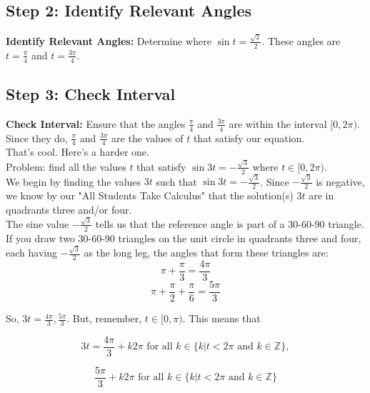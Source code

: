 \documentclass[12pt]{article}
\begin{document}
\subsection*{Step 2: Identify Relevant Angles}
\textbf{Identify Relevant Angles:} Determine where \( \sin t = \frac{\sqrt{2}}{2} \). These angles are \( t = \frac{\pi}{4} \) and \( t = \frac{3\pi}{4} \).

\subsection*{Step 3: Check Interval}
\textbf{Check Interval:} Ensure that the angles \( \frac{\pi}{4} \) and \( \frac{3\pi}{4} \) are within the interval \( [0, 2\pi) \).\\

Since they do, \( \frac{\pi}{4} \) and \( \frac{3\pi}{4} \) are the values of \(t\) that satisfy our equation.\\

That's cool. Here's a harder one.\\

Problem: find all the values \(t\) that satisfy \(\sin{3t}=-\frac{\sqrt{3}}{2}\) where \(t\in[0,2\pi)\).\\

We begin by finding the values \(3t\) such that \(\sin3t=-\frac{\sqrt{3}}{2}\). Since \(-\frac{\sqrt{3}}{2}\) is negative, we know by our "All Students Take Calculus" that the solution(s) \(3t\) are in  quadrants three and/or four.\\

The sine value \(-\frac{\sqrt{3}}{2}\) tells us that the reference angle is part of a 30-60-90 triangle.\\

If you draw two 30-60-90 triangles on the unit circle in quadrants three and four, each having \(-\frac{\sqrt{3}}{2}\) as the long leg, the angles that form these triangles are:\\

\[\pi+\frac{\pi}{3}=\frac{4\pi}{3}\]
\[\pi+\frac{\pi}{2}+\frac{\pi}{6}=\frac{5\pi}{3}\]

So, \(3t=\frac{4\pi}{3}, \frac{5\pi}{3}\). But, remember, \(t\in[0,\pi)\). This means that

\[3t=\frac{4\pi}{3}+k2\pi \text{ for all \(k\in\{k | t<2\pi \text{ and } k\in\mathbb{Z}\}\)},\]

\[\frac{5\pi}{3}+k2\pi \text{ for all \(k\in\{k | t<2\pi \text{ and } k\in\mathbb{Z}\}\)}\]\\
\end{document}

